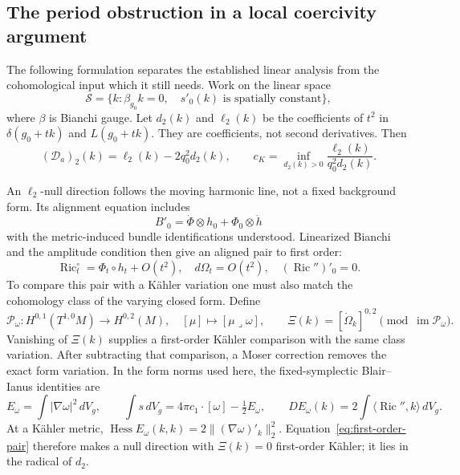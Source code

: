 \documentclass[11pt]{article}
\newcommand{\Ric}{\operatorname{Ric}}
\newcommand{\dd}{\,dV_g}
\theoremstyle{definition}
\theoremstyle{remark}
\begin{document}
\subsection{The period obstruction in a local coercivity argument}

The following formulation separates the established linear analysis from
the cohomological input which it still needs. Work on the linear space
\[
 \mathcal S=\{k:\beta_{g_0}k=0,\quad s'_0(k)
                    \text{ is spatially constant}\},
\]
where $\beta$ is Bianchi gauge. Let $d_2(k)$ and $\ell_2(k)$ be the
coefficients of $t^2$ in $\delta(g_0+tk)$ and $L(g_0+tk)$.
They are coefficients, not second derivatives. Then
\begin{equation}
 (\mathscr D_a)_2(k)=\ell_2(k)-2q_0^2d_2(k),\qquad
 c_K=\inf_{d_2(k)>0}\frac{\ell_2(k)}{q_0^2d_2(k)}.
 \label{eq:cK}
\end{equation}

An $\ell_2$-null direction follows the moving harmonic line, not a fixed
background form. Its alignment equation includes
\[
 B'_0=\dot\Phi\otimes h_0+\Phi_0\otimes\dot h
\]
with the metric-induced bundle identifications understood. Linearized
Bianchi and the amplitude condition then give an aligned pair to first
order:
\begin{equation}
 \Ric_t^\circ=\Phi_t\circ h_t+O(t^2),\quad
 d\Omega_t=O(t^2),\quad (\Ric'')'_0=0.
 \label{eq:first-order-pair}
\end{equation}
To compare this pair with a K\"ahler variation one must also match the
cohomology class of the varying closed form. Define
\begin{equation}
 \mathcal P_\omega:H^{0,1}(T^{1,0}M)\longrightarrow H^{0,2}(M),
 \quad [\mu]\longmapsto[\mu\mathbin{\lrcorner}\omega],\qquad
 \Xi(k)=[\dot\Omega_k]^{0,2}\pmod{\operatorname{im}\mathcal P_\omega}.
 \label{eq:Xi}
\end{equation}
Vanishing of $\Xi(k)$ supplies a first-order K\"ahler comparison with
the same class variation. After subtracting that comparison, a Moser
correction removes the exact form variation. In the form norms used here,
the fixed-symplectic Blair--Ianus identities are
\begin{equation}
 E_\omega=\int|\nabla\omega|^2\dd,\qquad
 \int s\dd=4\pi c_1\cdot[\omega]-\tfrac12E_\omega,\qquad
 DE_\omega(k)=2\int\langle\Ric'',k\rangle\dd.
 \label{eq:blair}
\end{equation}
At a K\"ahler metric,
$\operatorname{Hess}E_\omega(k,k)=2\|(\nabla\omega)'_k\|_2^2$.
Equation~\eqref{eq:first-order-pair} therefore makes a null direction with
$\Xi(k)=0$ first-order K\"ahler; it lies in the radical of $d_2$.
\end{document}
